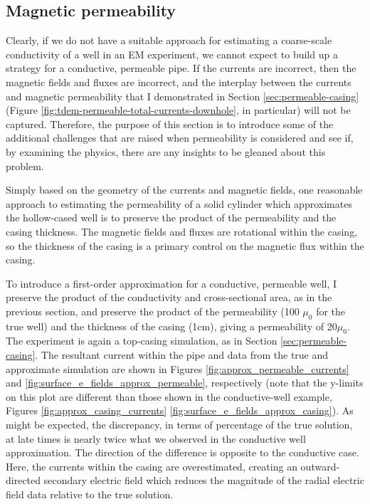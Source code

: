 \subsection{Magnetic permeability}
Clearly, if we do not have a suitable approach for estimating a coarse-scale  conductivity of a well in an EM experiment, we cannot expect to build up a strategy for a conductive, permeable pipe. If the currents are incorrect, then the magnetic fields and fluxes are incorrect, and the interplay between the currents and magnetic permeability that I demonstrated in Section \ref{sec:permeable-casing} (Figure \ref{fig:tdem-permeable-total-currents-downhole}, in particular) will not be captured. Therefore, the purpose of this section is to introduce some of the additional challenges that are raised when permeability is considered and see if, by examining the physics, there are any insights to be gleaned about this problem.

Simply based on the geometry of the currents and magnetic fields, one reasonable approach to estimating the permeability of a solid cylinder which approximates the hollow-cased well is to preserve the product of the permeability and the casing thickness. The magnetic fields and fluxes are rotational within the casing, so the thickness of the casing is a primary control on the magnetic flux within the casing.




To introduce a first-order approximation for a conductive, permeable well, I preserve the product of the conductivity and cross-sectional area, as in the previous section, and preserve the product of the permeability (100 $\mu_0$ for the true well) and the thickness of the casing (1cm), giving a permeability of 20$\mu_0$. The experiment is again a top-casing simulation, as in Section \ref{sec:permeable-casing}. The resultant current within the pipe and data from the true and approximate simulation are shown in Figures \ref{fig:approx_permeable_currents} and \ref{fig:surface_e_fields_approx_permeable}, respectively (note that the y-limits on this plot are different than those shown in the conductive-well example, Figures \ref{fig:approx_casing_currents} \ref{fig:surface_e_fields_approx_casing}). As might be expected, the discrepancy, in terms of percentage of the true solution, at late times is nearly twice what we observed in the conductive well approximation. The direction of the difference is opposite to the conductive case. Here, the currents within the casing are overestimated, creating an outward-directed secondary electric field which reduces the magnitude of the radial electric field data relative to the true solution.



